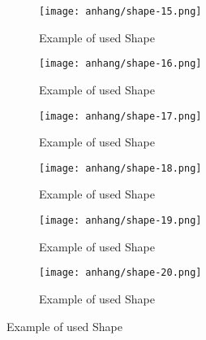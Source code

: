 	
	
	\begin{figure}[h]
		\centering
		\begin{subfigure}{0.45\textwidth}
			\centering
			\texttt{[image: anhang/shape-15.png]}
			\caption[Example of used Shape, created by \cite{Quixel}]{Example of used Shape}
		\end{subfigure}
		\begin{subfigure}{0.45\textwidth}
			\centering
			\texttt{[image: anhang/shape-16.png]}
			\caption[Example of used Shape, created by \cite{Quixel}]{Example of used Shape}
		\end{subfigure}
	
		\begin{subfigure}{0.45\textwidth}
			\centering
			\texttt{[image: anhang/shape-17.png]}
			\caption[Example of used Shape, created by \cite{Quixel}]{Example of used Shape}
		\end{subfigure}
		\begin{subfigure}{0.45\textwidth}
			\centering
			\texttt{[image: anhang/shape-18.png]}
			\caption[Example of used Shape, created by \cite{Quixel}]{Example of used Shape}
		\end{subfigure}
		
		\begin{subfigure}{0.45\textwidth}
			\centering
			\texttt{[image: anhang/shape-19.png]}
			\caption[Example of used Shape, created by \cite{Quixel}]{Example of used Shape}
		\end{subfigure}
		\begin{subfigure}{0.45\textwidth}
			\centering
			\texttt{[image: anhang/shape-20.png]}
			\caption[Example of used Shape, created by \cite{Quixel}]{Example of used Shape}
		\end{subfigure}
	
	\end{figure}
